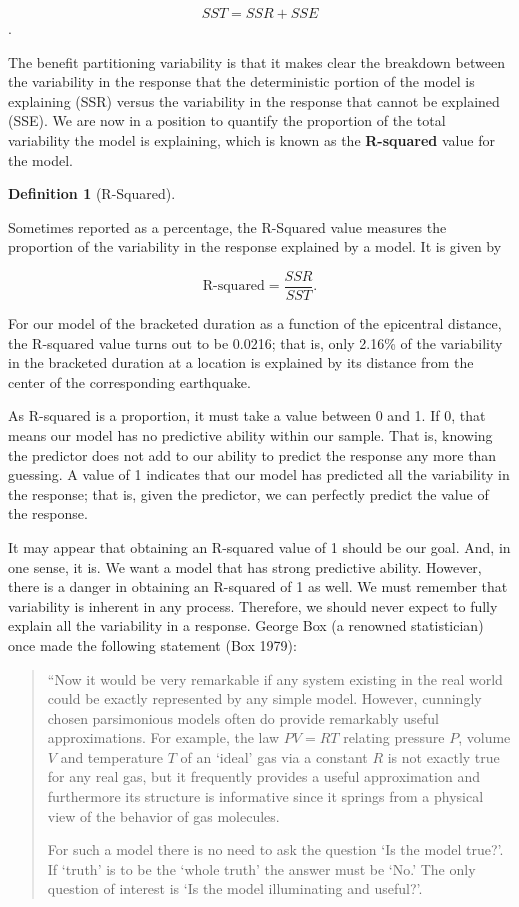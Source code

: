\documentclass[
  letterpaper,
  DIV=11,
  numbers=noendperiod]{scrreprt}
\theoremstyle{plain}
\theoremstyle{definition}
\theoremstyle{definition}
\newtheorem{definition}{Definition}[chapter]
\theoremstyle{remark}
\begin{document}
\[SST = SSR + SSE\].

The benefit partitioning variability is that it makes clear the
breakdown between the variability in the response that the deterministic
portion of the model is explaining (SSR) versus the variability in the
response that cannot be explained (SSE). We are now in a position to
quantify the proportion of the total variability the model is
explaining, which is known as the \textbf{R-squared} value for the
model.

\begin{definition}[R-Squared]\protect\hypertarget{def-r-squared}{}\label{def-r-squared}

Sometimes reported as a percentage, the R-Squared value measures the
proportion of the variability in the response explained by a model. It
is given by

\[\text{R-squared} = \frac{SSR}{SST}.\]

\end{definition}

For our model of the bracketed duration as a function of the epicentral
distance, the R-squared value turns out to be 0.0216; that is, only
2.16\% of the variability in the bracketed duration at a location is
explained by its distance from the center of the corresponding
earthquake.

As R-squared is a proportion, it must take a value between 0 and 1. If
0, that means our model has no predictive ability within our sample.
That is, knowing the predictor does not add to our ability to predict
the response any more than guessing. A value of 1 indicates that our
model has predicted all the variability in the response; that is, given
the predictor, we can perfectly predict the value of the response.

It may appear that obtaining an R-squared value of 1 should be our goal.
And, in one sense, it is. We want a model that has strong predictive
ability. However, there is a danger in obtaining an R-squared of 1 as
well. We must remember that variability is inherent in any process.
Therefore, we should never expect to fully explain all the variability
in a response. George Box (a renowned statistician) once made the
following statement (Box 1979):

\begin{quote}
``Now it would be very remarkable if any system existing in the real
world could be exactly represented by any simple model. However,
cunningly chosen parsimonious models often do provide remarkably useful
approximations. For example, the law \(PV = RT\) relating pressure
\(P\), volume \(V\) and temperature \(T\) of an `ideal' gas via a
constant \(R\) is not exactly true for any real gas, but it frequently
provides a useful approximation and furthermore its structure is
informative since it springs from a physical view of the behavior of gas
molecules.

For such a model there is no need to ask the question `Is the model
true?'. If `truth' is to be the `whole truth' the answer must be `No.'
The only question of interest is `Is the model illuminating and
useful?'.
\end{quote}
\end{document}
